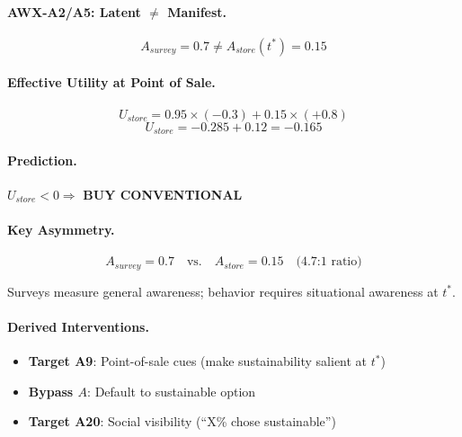 \paragraph{AWX-A2/A5: Latent $\neq$ Manifest.}
\begin{equation}
A_{survey} = 0.7 \neq A_{store}(t^*) = 0.15
\end{equation}

\paragraph{Effective Utility at Point of Sale.}
\begin{equation}
U_{store} = 0.95 \times (-0.3) + 0.15 \times (+0.8)
\end{equation}
\begin{equation}
\boxed{U_{store} = -0.285 + 0.12 = \mathbf{-0.165}}
\end{equation}

\paragraph{Prediction.}
$U_{store} < 0 \Rightarrow$ \textbf{BUY CONVENTIONAL}

\paragraph{Key Asymmetry.}
\begin{equation}
A_{survey} = 0.7 \quad \text{vs.} \quad A_{store} = 0.15 \quad \text{(4.7:1 ratio)}
\end{equation}

Surveys measure general awareness; behavior requires situational awareness at $t^*$.

\paragraph{Derived Interventions.}
\begin{itemize}
    \item \textbf{Target A9}: Point-of-sale cues (make sustainability salient at $t^*$)
    \item \textbf{Bypass $A$}: Default to sustainable option
    \item \textbf{Target A20}: Social visibility (``X\% chose sustainable'')
\end{itemize}


